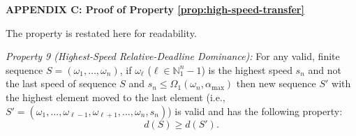 
\centerline{\large\bf APPENDIX C: Proof of Property \ref{prop:high-speed-transfer}}
\label{appendix:engCtrl-high-speed-transfer}
The property is restated here for readability.

\emph{Property 9 (Highest-Speed Relative-Deadline Dominance):}
For any valid, finite sequence $S = (\omega_1, \ldots, \omega_n)$, if $\omega_\ell$ ($\ell \in \mathbb{N}_1^n-1$) is the highest speed $s_n$ and not the last speed of sequence $S$ and $s_n \leq \Omega_1(\omega_n,\alpha_{\max})$ then new sequence $S'$ with the highest element moved to the last element (i.e., $S' = (\omega_1, \ldots, \omega_{\ell-1}, \omega_{\ell+1}, \ldots, \omega_n, s_n)$) is valid and has the following property: 
\begin{equation}\label{eqn:high-speed-transfer-appendix}
    d(S) \geq d(S').
\end{equation}






